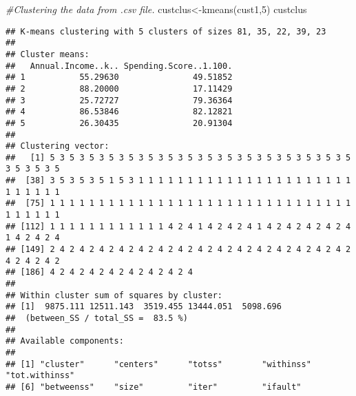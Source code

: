 \documentclass[
]{article}
\newenvironment{Shaded}{\begin{snugshade}}{\end{snugshade}}
\newcommand{\AttributeTok}[1]{\textcolor[rgb]{0.77,0.63,0.00}{#1}}
\newcommand{\CommentTok}[1]{\textcolor[rgb]{0.56,0.35,0.01}{\textit{#1}}}
\newcommand{\DecValTok}[1]{\textcolor[rgb]{0.00,0.00,0.81}{#1}}
\newcommand{\FloatTok}[1]{\textcolor[rgb]{0.00,0.00,0.81}{#1}}
\newcommand{\FunctionTok}[1]{\textcolor[rgb]{0.00,0.00,0.00}{#1}}
\newcommand{\NormalTok}[1]{#1}
\newcommand{\OtherTok}[1]{\textcolor[rgb]{0.56,0.35,0.01}{#1}}
\newcommand{\SpecialCharTok}[1]{\textcolor[rgb]{0.00,0.00,0.00}{#1}}
\newcommand{\StringTok}[1]{\textcolor[rgb]{0.31,0.60,0.02}{#1}}
\begin{document}
\begin{Shaded}
\begin{Highlighting}[]
\CommentTok{\#Clustering the data from .csv file. }
\NormalTok{custclus}\OtherTok{\textless{}{-}}\FunctionTok{kmeans}\NormalTok{(cust1,}\DecValTok{5}\NormalTok{)}
\NormalTok{custclus}
\end{Highlighting}
\end{Shaded}

\begin{verbatim}
## K-means clustering with 5 clusters of sizes 81, 35, 22, 39, 23
## 
## Cluster means:
##   Annual.Income..k.. Spending.Score..1.100.
## 1           55.29630               49.51852
## 2           88.20000               17.11429
## 3           25.72727               79.36364
## 4           86.53846               82.12821
## 5           26.30435               20.91304
## 
## Clustering vector:
##   [1] 5 3 5 3 5 3 5 3 5 3 5 3 5 3 5 3 5 3 5 3 5 3 5 3 5 3 5 3 5 3 5 3 5 3 5 3 5
##  [38] 3 5 3 5 3 5 1 5 3 1 1 1 1 1 1 1 1 1 1 1 1 1 1 1 1 1 1 1 1 1 1 1 1 1 1 1 1
##  [75] 1 1 1 1 1 1 1 1 1 1 1 1 1 1 1 1 1 1 1 1 1 1 1 1 1 1 1 1 1 1 1 1 1 1 1 1 1
## [112] 1 1 1 1 1 1 1 1 1 1 1 1 4 2 4 1 4 2 4 2 4 1 4 2 4 2 4 2 4 2 4 1 4 2 4 2 4
## [149] 2 4 2 4 2 4 2 4 2 4 2 4 2 4 2 4 2 4 2 4 2 4 2 4 2 4 2 4 2 4 2 4 2 4 2 4 2
## [186] 4 2 4 2 4 2 4 2 4 2 4 2 4 2 4
## 
## Within cluster sum of squares by cluster:
## [1]  9875.111 12511.143  3519.455 13444.051  5098.696
##  (between_SS / total_SS =  83.5 %)
## 
## Available components:
## 
## [1] "cluster"      "centers"      "totss"        "withinss"     "tot.withinss"
## [6] "betweenss"    "size"         "iter"         "ifault"
\end{verbatim}

\begin{Shaded}
\end{Shaded}
\end{document}
